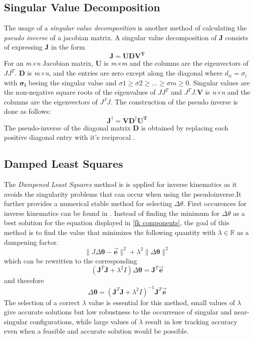 \subsection{Singular Value Decomposition}
The usage of a \textit{singular value decomposition} is another method of calculating the \textit{pseudo inverse} of a jacobian matrix. A singular value decomposition of \textbf{J} consists of expressing \textbf{J} in the form
\begin{equation}
\pmb{J} = \pmb{UDV^{T}}
\end{equation} 
For an \textit{m×n} Jacobian matrix, \textbf{U} is\textit{ m×m} and the columns are the eigenvectors of $JJ^{T}$. \textbf{D} is \textit{m×n}, and the entries are zero except along the diagonal where $d_{ii}=\sigma_{i}$ with $\pmb{\sigma_{i}}$ beeing the singular value and $\sigma 1\geq \sigma 2 \geq ...\geq \sigma m \geq 0$. Singular values are the non-negative square roots of the eigenvalues of $JJ^{T}$ and $ J^{T}J$.\textbf{V} is \textit{n×n} and the columns are the eigenvectors of $J^{J}J$.
The construction of the pseudo inverse is done as follows:
\begin{equation}
\pmb{J}^{\dagger} = \pmb{VD^{\dagger}U^{T}}
\end{equation} 
The pseudo-inverse of the diagonal matrix \textbf{D} is obtained by replacing each positive diagonal entry with it's reciprocal \cite{Golub.1965}.
\subsection{Damped Least Squares}
 The \textit{Dampened Least Squares} method is is applied for inverse kinematics as it avoids the singularity problems that can occur when using the pseudoinverse.It further provides a numerical stable method for selecting $\Delta\theta$. First occurences for inverse kinematics can be found in \cite{Wampler.1986,Nakamura.1986}.
Instead of finding the minimum for $\Delta\theta$ as a best solution for the equation displayed in \ref{fk components}, the goal of this method is to find the value that minimizes the following quantity with $\lambda \in \mathbb{R} $ as a dampening factor.
\begin{equation}
\parallel J\Delta\pmb{\theta}-\vec{\pmb{e}}\parallel^{2}+\lambda^{2}\parallel\Delta\pmb{\theta}\parallel^{2}
\end{equation}
which can be rewritten to the corresponding 
\begin{equation}
(\pmb{J}^{T}\pmb{J}+\lambda^{2}I)\Delta\pmb{\theta}=\pmb{J}^{T}\vec{\pmb{e}}
\end{equation}
and therefore 
\begin{equation}
\Delta\pmb{\theta}=(\pmb{J}^{T}\pmb{J}+\lambda^{2}I)^{-1}\pmb{J}^{T}\vec{\pmb{e}}
\end{equation}
The selection of a correct $\lambda$ value is essential for this method, small values of $\lambda$ give accurate solutions but low robustness to the occurrence of singular and near-singular configurations, while large  values of $\lambda$ result in low tracking accuracy even when a feasible and accurate solution would be possible\cite{Chiaverini.1994,AndreasAristidouandJoanLasenby.2009}.

